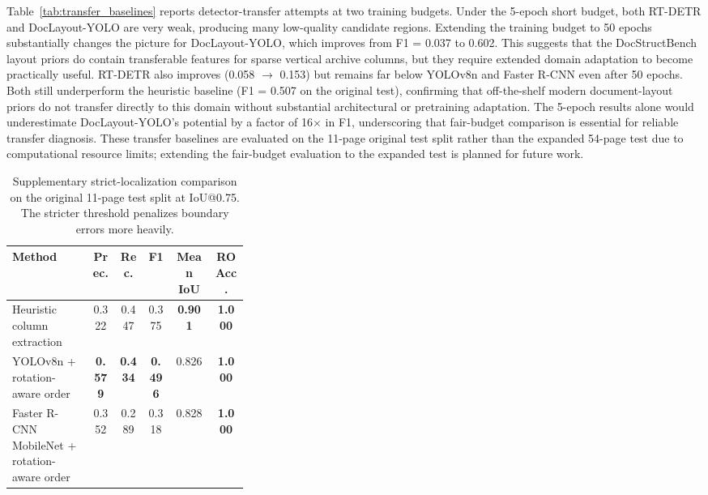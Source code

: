 \documentclass[12pt]{article}
\begin{document}
Table~\ref{tab:transfer_baselines} reports detector-transfer attempts at two training budgets. Under the 5-epoch short budget, both RT-DETR and DocLayout-YOLO are very weak, producing many low-quality candidate regions. Extending the training budget to 50 epochs substantially changes the picture for DocLayout-YOLO, which improves from F1 = 0.037 to 0.602. This suggests that the DocStructBench layout priors do contain transferable features for sparse vertical archive columns, but they require extended domain adaptation to become practically useful. RT-DETR also improves (0.058 $\to$ 0.153) but remains far below YOLOv8n and Faster R-CNN even after 50 epochs. Both still underperform the heuristic baseline (F1 = 0.507 on the original test), confirming that off-the-shelf modern document-layout priors do not transfer directly to this domain without substantial architectural or pretraining adaptation. The 5-epoch results alone would underestimate DocLayout-YOLO's potential by a factor of 16$\times$ in F1, underscoring that fair-budget comparison is essential for reliable transfer diagnosis. These transfer baselines are evaluated on the 11-page original test split rather than the expanded 54-page test due to computational resource limits; extending the fair-budget evaluation to the expanded test is planned for future work.


\begin{table}[t]
\centering
\scriptsize\setlength{\tabcolsep}{3pt}
\caption{Supplementary strict-localization comparison on the original 11-page test split at IoU@0.75. The stricter threshold penalizes boundary errors more heavily.}
\label{tab:iou75}
\begin{tabular}{p{0.34\linewidth}ccccc}
\toprule
Method & Prec. & Rec. & F1 & Mean IoU & RO Acc. \\
\midrule
Heuristic column extraction & 0.322 & 0.447 & 0.375 & \textbf{0.901} & \textbf{1.000} \\
YOLOv8n + rotation-aware order & \textbf{0.579} & \textbf{0.434} & \textbf{0.496} & 0.826 & \textbf{1.000} \\
Faster R-CNN MobileNet + rotation-aware order & 0.352 & 0.289 & 0.318 & 0.828 & \textbf{1.000} \\
\bottomrule
\end{tabular}
\end{table}
\end{document}
